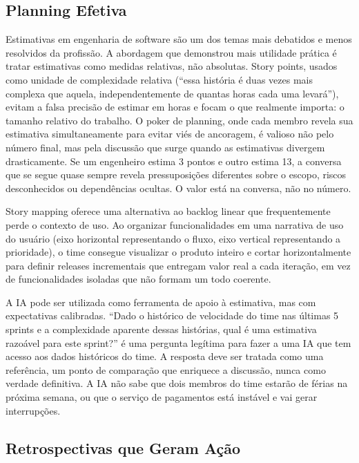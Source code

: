 \subsection{Planning Efetiva}

Estimativas em engenharia de software são um dos temas mais debatidos e menos
resolvidos da profissão. A abordagem que demonstrou mais utilidade prática é
tratar estimativas como medidas relativas, não absolutas. Story points, usados
como unidade de complexidade relativa (``essa história é duas vezes mais
complexa que aquela, independentemente de quantas horas cada uma levará''),
evitam a falsa precisão de estimar em horas e focam o que realmente importa:
o tamanho relativo do trabalho. O poker de planning, onde cada membro
revela sua estimativa simultaneamente para evitar viés de ancoragem, é
valioso não pelo número final, mas pela discussão que surge quando as
estimativas divergem drasticamente. Se um engenheiro estima 3 pontos e
outro estima 13, a conversa que se segue quase sempre revela
pressuposições diferentes sobre o escopo, riscos desconhecidos ou
dependências ocultas. O valor está na conversa, não no número.

Story mapping oferece uma alternativa ao backlog linear que frequentemente
perde o contexto de uso. Ao organizar funcionalidades em uma narrativa de
uso do usuário (eixo horizontal representando o fluxo, eixo vertical
representando a prioridade), o time consegue visualizar o produto inteiro
e cortar horizontalmente para definir releases incrementais que entregam
valor real a cada iteração, em vez de funcionalidades isoladas que não
formam um todo coerente.

A IA pode ser utilizada como ferramenta de apoio à estimativa, mas com
expectativas calibradas. ``Dado o histórico de velocidade do time nas
últimas 5 sprints e a complexidade aparente dessas histórias, qual é uma
estimativa razoável para este sprint?'' é uma pergunta legítima para fazer
a uma IA que tem acesso aos dados históricos do time. A resposta deve ser
tratada como uma referência, um ponto de comparação que enriquece a
discussão, nunca como verdade definitiva. A IA não sabe que dois membros
do time estarão de férias na próxima semana, ou que o serviço de pagamentos
está instável e vai gerar interrupções.

\subsection{Retrospectivas que Geram Ação}

